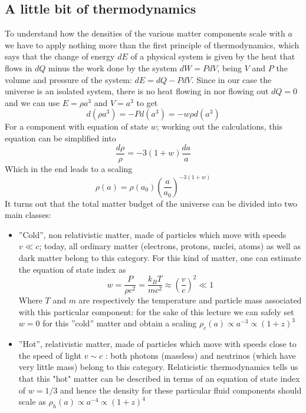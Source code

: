\subsection{A little bit of thermodynamics}
To understand how the densities of the various matter components scale with $a$ we have to apply nothing more than the first principle of thermodynamics, which says that the change of energy $dE$ of a physical system is given by the heat that flows in $dQ$ minus the work done by the system $dW=PdV$, being $V$ and $P$ the volume and pressure of the system: $dE=dQ-PdV$. Since in our case the universe is an isolated system, there is no heat flowing in nor flowing out $dQ=0$ and we can use $E=\rho a^3$ and $V=a^3$ to get
\begin{equation}
d(\rho a^3)=-Pd(a^3)=-w\rho d(a^3)
\end{equation}
For a component with equation of state $w$; working out the calculations, this equation can be simplified into 
\begin{equation}
\frac{d\rho}{\rho}=-3(1+w)\frac{da}{a}
\end{equation}
Which in the end leads to a scaling 
\begin{equation}
\rho(a)=\rho(a_0)\left(\frac{a}{a_0}\right)^{-3(1+w)}
\end{equation}
It turns out that the total matter budget of the universe can be divided into two main classes:
\begin{itemize}
\item ''Cold'', non relativistic matter, made of particles which move with speeds $v\ll c$; today, all ordinary matter (electrons, protons, nuclei, atoms) as well as dark matter belong to this category. For this kind of matter, one can estimate the equation of state index as 
\begin{equation}
w=\frac{P}{\rho c^2}=\frac{k_B T}{mc^2}\approx \left(\frac{v}{c}\right)^2\ll 1
\end{equation}
Where $T$ and $m$ are respectively the temperature and particle mass associated with this particular component: for the sake of this lecture we can safely set $w=0$ for this ''cold'' matter and obtain a scaling $\rho_c(a)\propto a^{-3}\propto (1+z)^3$
\item ''Hot'', relativistic matter, made of particles which move with speeds close to the speed of light $v\sim c $ : both photons (massless) and neutrinos (which have very little mass) belong to this category. Relaticistic thermodynamics tells us that this "hot" matter can be described in terms of an equation of state index of $w=1/3$ and hence the density for these particular fluid components should scale as $\rho_h(a)\propto a^{-4}\propto (1+z)^4$
\end{itemize}

